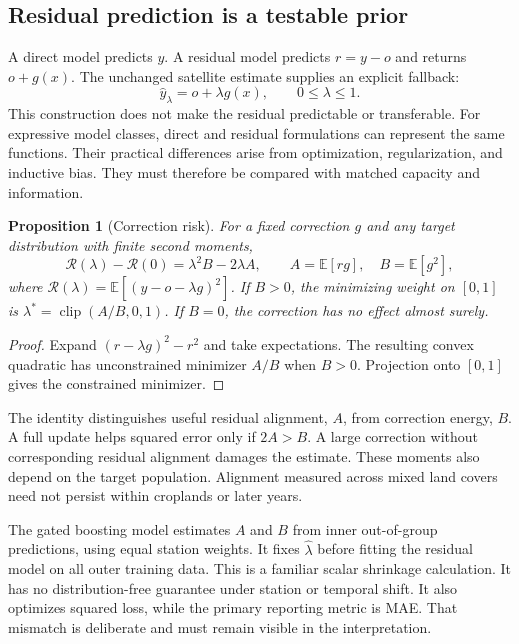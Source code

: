 \documentclass[10pt,letterpaper]{article}
\newcommand{\E}{\mathbb{E}}
\newtheorem{proposition}{Proposition}
\begin{document}
\subsection{Residual prediction is a testable prior}
A direct model predicts $y$.
A residual model predicts $r=y-o$ and returns $o+g(x)$.
The unchanged satellite estimate supplies an explicit fallback:
\begin{equation}
\widehat y_\lambda=o+\lambda g(x),\qquad 0\leq\lambda\leq1.
\label{eq:correction}
\end{equation}
This construction does not make the residual predictable or transferable.
For expressive model classes, direct and residual formulations can represent the same functions.
Their practical differences arise from optimization, regularization, and inductive bias.
They must therefore be compared with matched capacity and information.

\begin{proposition}[Correction risk]
For a fixed correction $g$ and any target distribution with finite second moments,
\begin{equation}
\mathcal R(\lambda)-\mathcal R(0)=\lambda^2 B-2\lambda A,
\qquad A=\E[rg],\quad B=\E[g^2],
\label{eq:risk}
\end{equation}
where $\mathcal R(\lambda)=\E[(y-o-\lambda g)^2]$.
If $B>0$, the minimizing weight on $[0,1]$ is $\lambda^*=\operatorname{clip}(A/B,0,1)$.
If $B=0$, the correction has no effect almost surely.
\end{proposition}
\begin{proof}
Expand $(r-\lambda g)^2-r^2$ and take expectations.
The resulting convex quadratic has unconstrained minimizer $A/B$ when $B>0$.
Projection onto $[0,1]$ gives the constrained minimizer.
\end{proof}

The identity distinguishes useful residual alignment, $A$, from correction energy, $B$.
A full update helps squared error only if $2A>B$.
A large correction without corresponding residual alignment damages the estimate.
These moments also depend on the target population.
Alignment measured across mixed land covers need not persist within croplands or later years.

The gated boosting model estimates $A$ and $B$ from inner out-of-group predictions, using equal station weights.
It fixes $\widehat\lambda$ before fitting the residual model on all outer training data.
This is a familiar scalar shrinkage calculation.
It has no distribution-free guarantee under station or temporal shift.
It also optimizes squared loss, while the primary reporting metric is MAE.
That mismatch is deliberate and must remain visible in the interpretation.
\end{document}
